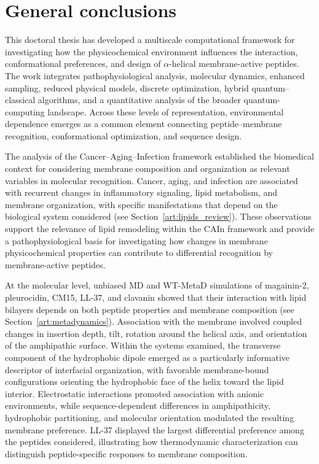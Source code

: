 \chapter{General conclusions}\label{conclusions}

\newpage
This doctoral thesis has developed a multiscale computational framework for investigating how the physicochemical environment influences the interaction, conformational preferences, and design of $\alpha$-helical membrane-active peptides. The work integrates pathophysiological analysis, molecular dynamics, enhanced sampling, reduced physical models, discrete optimization, hybrid quantum--classical algorithms, and a quantitative analysis of the broader quantum-computing landscape. Across these levels of representation, environmental dependence emerges as a common element connecting peptide--membrane recognition, conformational optimization, and sequence design.

The analysis of the Cancer--Aging--Infection framework established the biomedical context for considering membrane composition and organization as relevant variables in molecular recognition. Cancer, aging, and infection are associated with recurrent changes in inflammatory signaling, lipid metabolism, and membrane organization, with specific manifestations that depend on the biological system considered \cite{DANI_LIPIDOS} (see Section~\ref{art:lipids_review}). These observations support the relevance of lipid remodeling within the CAIn framework and provide a pathophysiological basis for investigating how changes in membrane physicochemical properties can contribute to differential recognition by membrane-active peptides.

At the molecular level, unbiased MD and WT-MetaD simulations of magainin-2, pleurocidin, CM15, LL-37, and clavanin showed that their interaction with lipid bilayers depends on both peptide properties and membrane composition \cite{DANI_METADINAMICA} (see Section~\ref{art:metadynamics}). Association with the membrane involved coupled changes in insertion depth, tilt, rotation around the helical axis, and orientation of the amphipathic surface. Within the systems examined, the transverse component of the hydrophobic dipole emerged as a particularly informative descriptor of interfacial organization, with favorable membrane-bound configurations orienting the hydrophobic face of the helix toward the lipid interior. Electrostatic interactions promoted association with anionic environments, while sequence-dependent differences in amphipathicity, hydrophobic partitioning, and molecular orientation modulated the resulting membrane preference. LL-37 displayed the largest differential preference among the peptides considered, illustrating how thermodynamic characterization can distinguish peptide-specific responses to membrane composition.

